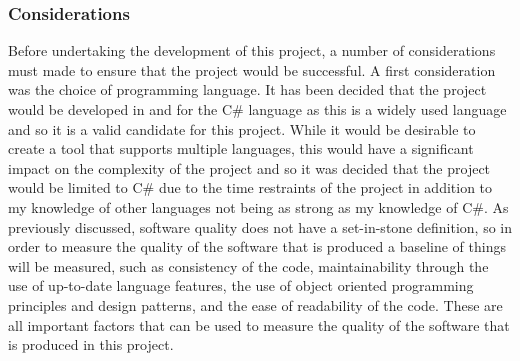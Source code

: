 \subsubsection{Considerations}

Before undertaking the development of this project, a number of considerations must made to ensure that the project would be successful. A first consideration was the choice of programming language. It has been decided that the project would be developed in and for the C\# language as this is a widely used language and so it is a valid candidate for this project. While it would be desirable to create a tool that supports multiple languages, this would have a significant impact on the complexity of the project and so it was decided that the project would be limited to C\# due to the time restraints of the project in addition to my knowledge of other languages not being as strong as my knowledge of C\#.
As previously discussed, software quality does not have a set-in-stone definition, so in order to measure the quality of the software that is produced a baseline of things will be measured, such as consistency of the code, maintainability through the use of up-to-date language features, the use of object oriented programming principles and design patterns, and the ease of readability of the code. These are all important factors that can be used to measure the quality of the software that is produced in this project.
